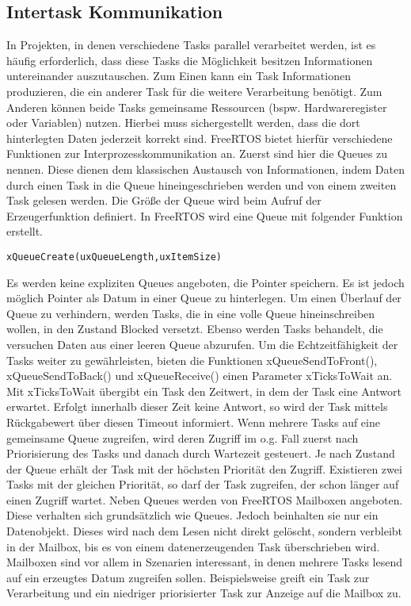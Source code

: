 \subsection{Intertask Kommunikation}
In Projekten, in denen verschiedene Tasks parallel verarbeitet werden, ist es häufig erforderlich, dass diese Tasks die Möglichkeit besitzen Informationen untereinander auszutauschen. Zum Einen kann ein Task Informationen produzieren, die ein anderer Task für die weitere Verarbeitung benötigt. Zum Anderen können beide Tasks gemeinsame Ressourcen (bspw. Hardwareregister oder Variablen) nutzen. Hierbei muss sichergestellt werden, dass die dort hinterlegten Daten jederzeit korrekt sind. FreeRTOS bietet hierfür verschiedene Funktionen zur Interprozesskommunikation an. Zuerst sind hier die Queues zu nennen. Diese dienen dem klassischen Austausch von Informationen, indem Daten durch einen Task in die Queue hineingeschrieben werden und von einem zweiten Task gelesen werden. Die Größe der Queue wird beim Aufruf der Erzeugerfunktion definiert. In FreeRTOS wird eine Queue mit folgender Funktion erstellt. 
\begin{lstlisting}[numbers = none]
xQueueCreate(uxQueueLength,uxItemSize)
\end{lstlisting}
Es werden keine expliziten Queues angeboten, die Pointer speichern. Es ist jedoch möglich Pointer als Datum in einer Queue zu hinterlegen. Um einen Überlauf der Queue zu verhindern, werden Tasks, die in eine volle Queue hineinschreiben wollen, in den Zustand Blocked versetzt. Ebenso werden Tasks behandelt, die versuchen Daten aus einer leeren Queue abzurufen. Um die Echtzeitfähigkeit der Tasks weiter zu gewährleisten, bieten die Funktionen xQueueSendToFront(), xQueueSendToBack() und xQueueReceive() einen Parameter xTicksToWait an. Mit xTicksToWait übergibt ein Task den Zeitwert, in dem der Task eine Antwort erwartet. Erfolgt innerhalb dieser Zeit keine Antwort, so wird der Task mittels Rückgabewert über diesen Timeout informiert.
Wenn mehrere Tasks auf eine gemeinsame Queue zugreifen, wird deren Zugriff im o.g. Fall zuerst nach Priorisierung des Tasks und danach durch Wartezeit gesteuert. Je nach Zustand der Queue erhält der Task mit der höchsten Priorität den Zugriff. Existieren zwei Tasks mit der gleichen Priorität, so darf der Task zugreifen, der schon länger auf einen Zugriff wartet.\newline
Neben Queues werden von FreeRTOS Mailboxen angeboten. Diese verhalten sich grund\-sätz\-lich wie Queues. Jedoch beinhalten sie nur ein Datenobjekt. Dieses wird nach dem Lesen nicht direkt gelöscht, sondern verbleibt in der Mailbox, bis es von einem datenerzeugenden Task über\-schrie\-ben wird. Mailboxen sind vor allem in Szenarien interessant, in denen mehrere Tasks lesend auf ein erzeugtes Datum zugreifen sollen. Beispielsweise greift ein Task zur Verarbeitung und ein niedriger priorisierter Task zur Anzeige auf die Mailbox zu.\newline
